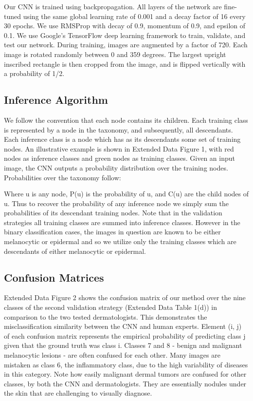 Our CNN is trained using backpropagation. All layers of the network are fine-tuned using the same global learning rate of 0.001 and a decay factor of 16 every 30 epochs. We use RMSProp with decay of 0.9, momentum of 0.9, and epsilon of 0.1. We use Google’s TensorFlow \cite{abadi2016tensorflow} deep learning framework to train, validate, and test our network. During training, images are augmented by a factor of 720. Each image is rotated randomly between 0 and 359 degrees. The largest upright inscribed rectangle is then cropped from the image, and is flipped vertically with a probability of 1/2. 

\subsection{Inference Algorithm}
We follow the convention that each node contains its children. Each training class is represented by a node in the taxonomy, and subsequently, all descendants. Each inference class is a node which has as its descendants some set of training nodes. An illustrative example is shown in Extended Data Figure 1, with red nodes as inference classes and green nodes as training classes. Given an input image, the CNN outputs a probability distribution over the training nodes. Probabilities over the taxonomy follow:

Where u is any node, P(u) is the probability of u, and C(u) are the child nodes of u. Thus to recover the probability of any inference node we simply sum the probabilities of its descendant training nodes. Note that in the validation strategies all training classes are summed into inference classes. However in the binary classification cases, the images in question are known to be either melanocytic or epidermal and so we utilize only the training classes which are descendants of either melanocytic or epidermal.

\subsection{Confusion Matrices}
Extended Data Figure 2 shows the confusion matrix of our method over the nine classes of the second validation strategy (Extended Data Table 1(d)) in comparison to the two tested dermatologists. This demonstrates the misclassification similarity between the CNN and human experts. Element (i, j) of each confusion matrix represents the empirical probability of predicting class j given that the ground truth was class i. Classes 7 and 8 - benign and malignant melanocytic lesions - are often confused for each other. Many images are mistaken as class 6, the inflammatory class, due to the high variability of diseases in this category. Note how easily malignant dermal tumors are confused for other classes, by both the CNN and dermatologists. They are essentially nodules under the skin that are challenging to visually diagnose. 

